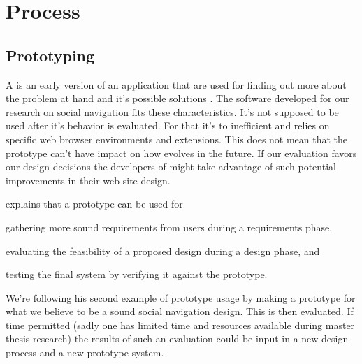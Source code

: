 %
%
%

\section{Process}

\subsection{Prototyping}

A  is an early version of an application that are used for
finding out more about the problem at hand and it's possible solutions
\citep[]{sommerville06}.
The software developed for our research on social navigation fits these
characteristics. It's not supposed to be used after it's behavior is
evaluated. For that it's to inefficient and relies on specific web browser
environments and extensions. This does not mean that the prototype can't have
impact on how \urort{} evolves in the future. If our evaluation favors our
design decisions the developers of \urort{} might take advantage of such
potential improvements in their web site design.

\citet[]{sommerville06} explains that a prototype can be used for
\begin{inparaenum}[(i)]
  \item gathering more sound requirements from users during a
    requirements phase,
  \item evaluating the feasibility of a proposed design during a
    design phase, and
  \item testing the final system by verifying it against the prototype.
\end{inparaenum}
We're following his second example of prototype usage by making a prototype
for what we believe to be a sound social navigation design. This is then
evaluated. If time permitted (sadly one has limited time and resources
available during master thesis research) the results of such an evaluation
could be input in a new design process and a new prototype system.

